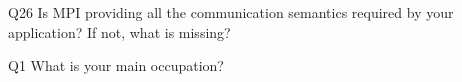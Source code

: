 \begin{description}%
\item{Q26} Is MPI providing all the communication semantics required by your application? If not, what is missing?%
\item{Q1} What is your main occupation?%
\end{description}%
